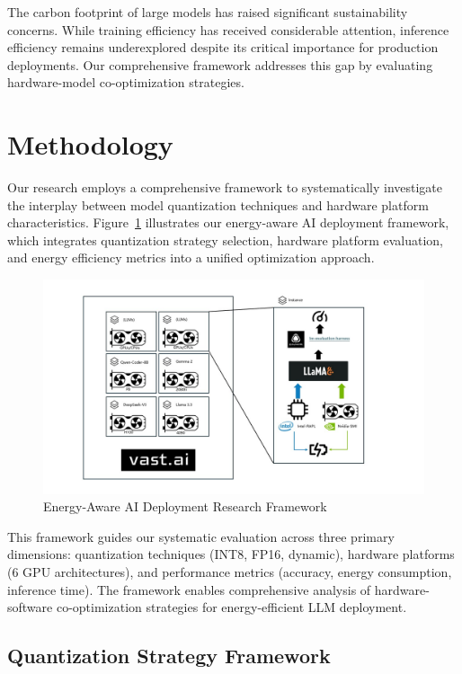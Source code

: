 \documentclass[sigconf,review]{acmart}
\begin{document}
The carbon footprint of large models has raised significant sustainability concerns. While training efficiency has received considerable attention, inference efficiency remains underexplored despite its critical importance for production deployments. Our comprehensive framework addresses this gap by evaluating hardware-model co-optimization strategies.

\section{Methodology}

Our research employs a comprehensive framework to systematically investigate the interplay between model quantization techniques and hardware platform characteristics. Figure~\ref{fig:research_framework} illustrates our energy-aware AI deployment framework, which integrates quantization strategy selection, hardware platform evaluation, and energy efficiency metrics into a unified optimization approach.

\begin{figure}[h]
\centering
\includegraphics[width=0.9\columnwidth]{../final_pr/latex-pr/img/CAS-kuangjia.jpg}
\caption{Energy-Aware AI Deployment Research Framework}
\label{fig:research_framework}
\end{figure}

This framework guides our systematic evaluation across three primary dimensions: quantization techniques (INT8, FP16, dynamic), hardware platforms (6 GPU architectures), and performance metrics (accuracy, energy consumption, inference time). The framework enables comprehensive analysis of hardware-software co-optimization strategies for energy-efficient LLM deployment.

\subsection{Quantization Strategy Framework}
\end{document}
